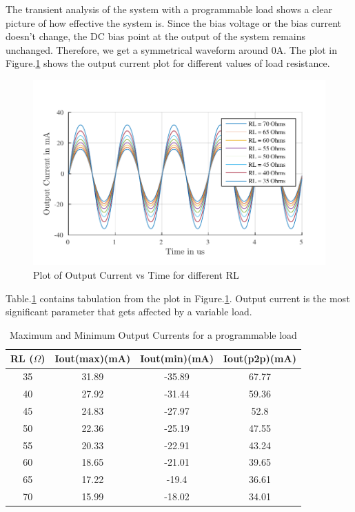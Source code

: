 The transient analysis of the system with a programmable load shows a clear picture of how effective the system is. Since the bias voltage or the bias current doesn't change, the DC bias point at the output of the system remains unchanged. Therefore, we get a symmetrical waveform around 0A. The plot in Figure.\ref{fig:RL_SINE} shows the output current plot for different values of load resistance. 
\begin{figure} [H]
\centering
\includegraphics[scale=1]{Figures/Plots/Ov_Sine_RL.pdf}
\caption{Plot of Output Current vs Time for different RL}
\label{fig:RL_SINE}
\end{figure}
Table.\ref{tab:RL_trans_1} contains tabulation from the plot in Figure.\ref{fig:RL_SINE}. Output current is the most significant parameter that gets affected by a variable load.
\begin{table} [H]
\centering
\begin{tabular}{@{}cccc@{}}
\toprule
RL ($\Omega$)			& Iout(max)(mA)		& Iout(min)(mA)		& Iout(p2p)(mA) \\ \midrule
35					& 31.89 			& -35.89			& 67.77			\\
40					& 27.92 			& -31.44			& 59.36			\\
45					& 24.83 			& -27.97			& 52.8			\\
50					& 22.36 			& -25.19			& 47.55			\\
55					& 20.33 			& -22.91			& 43.24			\\
60					& 18.65 			& -21.01			& 39.65			\\
65					& 17.22 			& -19.4				& 36.61 		\\
70					& 15.99 			& -18.02			& 34.01			\\
\bottomrule
\end{tabular}
\caption{Maximum and Minimum Output Currents for a programmable load}
\label{tab:RL_trans_1}
\end{table}

